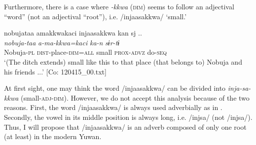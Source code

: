 Furthermore, there is a case where \textit{{}-kkwa} (\textsc{dim}) seems to follow an adjectival “word” (not an adjectival “root”), i.e. /injaasakkwa/ ‘small.’

\ea \label{ex:7:30}{\TM}
\glll  nobujataa  amakkwakaci  injaasakkwa  kan  sj ..\\
\textit{nobuja-taa}  \textit{a-ma-kkwa=kaci}  \textit{}  \textit{ka-n}  \textit{sɨr-tɨ}\\
Nobuja-\textsc{pl}  \textsc{dist}-place-\textsc{dim}=\textsc{all}  small  \textsc{prox}-\textsc{advz}  do-\textsc{seq}\\
\glt ‘(The ditch extends) small like this to that place (that belongs to) Nobuja and his friends ...’ [Co: 120415\_00.txt]

\z

At first sight, one may think the word /injaasakkwa/ can be divided into \textit{inja-sa-kkwa} (small-\textsc{adj}-\textsc{dim}). However, we do not accept this analysis because of the two reasons. First, the word /injaasakkwa/ is always used adverbially as in . Secondly, the vowel in its middle position is always long, i.e. /injsa/ (not /injsa/). Thus, I will propose that /injaasakkwa/ is an adverb composed of only one root (at least) in the modern Yuwan.
